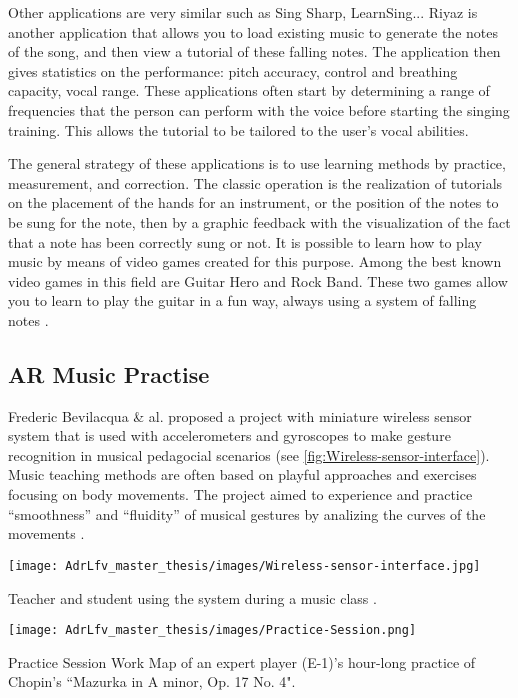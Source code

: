 Other applications are very similar such as Sing Sharp, LearnSing... Riyaz is another application that allows you to load existing music to generate the notes of the song, and then view a tutorial of these falling notes.
The application then gives statistics on the performance: pitch accuracy, control and breathing capacity, vocal range. These applications often start by determining a range of frequencies that the person can perform with the voice before starting the singing training. This allows the tutorial to be tailored to the user’s vocal abilities.

The general strategy of these applications is to use learning methods by practice, measurement, and correction. The classic operation is the realization of tutorials on the placement of the hands for an instrument, or the position of the notes to be sung for the note, then by a graphic feedback with the visualization of the fact that a note has been correctly sung or not.
It is possible to learn how to play music by means of video games created for this purpose. Among the best known video games in this field are Guitar Hero and Rock Band. These two games allow you to learn to play the guitar in a fun way, always using a system of falling notes \cite{farrugia2015tunes}.

\subsection{AR Music Practise}
Frederic Bevilacqua \& al. proposed a project with miniature wireless sensor system that is used with accelerometers and gyroscopes to make gesture recognition in musical pedagocial scenarios (see \ref{fig:Wireless-sensor-interface}). Music teaching methods are often based on playful approaches and exercises focusing on body movements. The project aimed to experience and practice “smoothness” and “fluidity” of musical gestures by analizing the curves of the movements \cite{bevilacqua2007wireless}.

\begin{marginfigure}
    \centering
    \texttt{[image: AdrLfv\_master\_thesis/images/Wireless-sensor-interface.jpg]}
    \caption{Teacher and student using the system during a music class \cite{bevilacqua2007wireless}.}
    \label{fig:Wireless-sensor-interface}
\end{marginfigure}

\begin{marginfigure}
    \centering
    \texttt{[image: AdrLfv\_master\_thesis/images/Practice-Session.png]}
    \caption{Practice Session Work Map of an expert player (E-1)’s hour-long practice of Chopin’s “Mazurka in A minor, Op. 17 No. 4".}
    \label{fig:Practice-Session}
\end{marginfigure}

